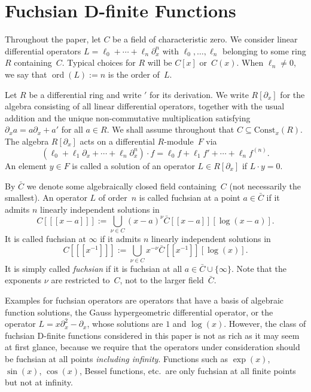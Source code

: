 \documentclass[final,1p,times,authoryear]{elsarticle}
\def\ord{\operatorname{ord}}
\begin{document}
\section{Fuchsian D-finite Functions}

Throughout the paper, let $C$ be a field of characteristic zero. We consider linear differential operators
$L=\ell_0+\cdots+\ell_n\partial_x^n$ with $\ell_0,\dots,\ell_n$ belonging to some ring
$R$ containing~$C$. Typical choices for $R$ will be $C[x]$ or~$C(x)$.
When $\ell_n\neq0$, we say that $\ord(L):=n$ is the order of~$L$.

Let $R$ be a differential ring and write $'$ for its derivation.
We write $R[\partial_x]$ for the algebra consisting of all linear differential operators, together
with the usual addition and the unique non-commutative multiplication satisfying
$\partial_xa=a\partial_x+a'$ for all $a\in R$. We shall assume throughout that $C\subseteq\mathrm{Const}_x(R)$.
The algebra $R[\partial_x]$ acts on a differential $R$-module~$F$ via
\[
  (\ell_0+\ell_1\partial_x+\cdots+\ell_n\partial_x^n)\cdot f=
   \ell_0f + \ell_1f' + \cdots + \ell_n f^{(n)}.
\]
An element $y\in F$ is called a solution of an operator $L\in R[\partial_x]$ if
$L\cdot y=0$.

By $\bar C$ we denote some algebraically closed field containing~$C$ (not necessarily the smallest).
An operator $L$ of order~$n$ is called fuchsian at a point $a\in\bar C$ if
it admits $n$ linearly independent solutions in
\[
  C[[[x-a]]] := \bigcup_{\nu\in C} (x-a)^\nu\bar C[[x-a]][\log(x-a)].
\]
It is called fuchsian at $\infty$ if it admits $n$ linearly independent solutions in
\[
  C[[[x^{-1}]]] := \bigcup_{\nu\in C} x^{-\nu} \bar C[[x^{-1}]][\log(x)].
\]
It is simply called \emph{fuchsian} if it is fuchsian at all $a\in\bar C\cup\{\infty\}$.
Note that the exponents $\nu$ are restricted to~$C$, not to the larger field~$\bar C$.

Examples for fuchsian operators are operators that have a basis of algebraic
function solutions, the Gauss hypergeometric differential operator, or the
operator $L=x\partial_x^2-\partial_x$, whose solutions are $1$ and $\log(x)$.
However, the class of fuchsian D-finite functions
considered in this paper is not as rich as it may seem at first glance, because
we require that the operators under consideration should be fuchsian at all
points \emph{including infinity}. Functions
such as $\exp(x)$, $\sin(x)$, $\cos(x)$, Bessel functions, etc.\ are only
fuchsian at all finite points but not at infinity.
\end{document}
